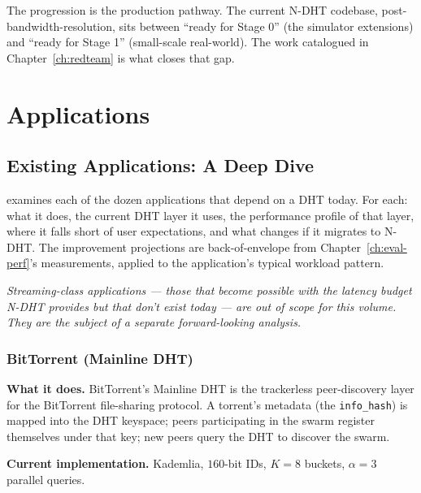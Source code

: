\documentclass[twoside,nobib]{tufte-book}
\newcommand{\NDHT}{N-DHT\xspace}
\begin{document}
The progression is the production pathway. The current
\NDHT codebase, post-bandwidth-resolution, sits between
``ready for Stage 0'' (the simulator extensions) and ``ready
for Stage 1'' (small-scale real-world). The work catalogued in
Chapter~\ref{ch:redteam} is what closes that gap.


\part{Applications}


\chapter{Existing Applications: A Deep Dive}
\label{ch:apps}

 examines each of the dozen applications
that depend on a DHT today. For each: what it does, the current
DHT layer it uses, the performance profile of that layer, where
it falls short of user expectations, and what changes if it
migrates to \NDHT. The improvement projections are back-of-envelope
from Chapter~\ref{ch:eval-perf}'s measurements, applied to the
application's typical workload pattern.

\textit{Streaming-class applications --- those that become
possible with the latency budget \NDHT provides but that don't
exist today --- are out of scope for this volume. They are the
subject of a separate forward-looking analysis.}

\section{BitTorrent (Mainline DHT)}

\textbf{What it does.} BitTorrent's Mainline DHT is the
trackerless peer-discovery layer for the BitTorrent file-sharing
protocol. A torrent's metadata (the \texttt{info\_hash}) is
mapped into the DHT keyspace; peers participating in the swarm
register themselves under that key; new peers query the DHT to
discover the swarm.

\textbf{Current implementation.} Kademlia, $160$-bit IDs, $K=8$
buckets, $\alpha = 3$ parallel queries.
\end{document}
